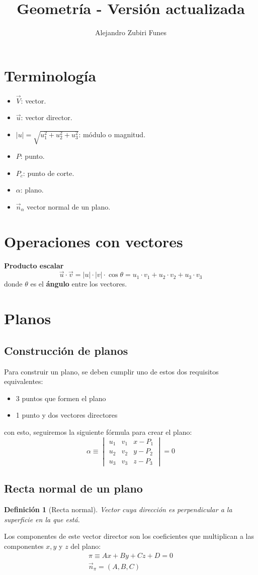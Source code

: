\documentclass{article}
\title{Geometría - Versión actualizada}
\author{Alejandro Zubiri Funes}
\date{}
\newtheorem*{normal*}{Definición}
\begin{document}
\maketitle
\section*{Terminología}
\begin{itemize}
    \item $\vec{V}$: vector.
    \item $\vec{u}$: vector director.
    \item $|u|=\sqrt{u_1^2+u_2^2+u_3^2}$: módulo o magnitud.
    \item $P$: punto.
    \item $P_c$: punto de corte.
    \item $\alpha$: plano.
    \item $\vec{n}_\alpha$ vector normal de un plano. 
\end{itemize}

\section*{Operaciones con vectores}
\textbf{Producto escalar}\\
\[
    \vec{u}\cdot \vec{v}=|u|\cdot |v|\cdot \cos \theta = u_1\cdot v_1+u_2\cdot v_2+u_3\cdot v_3
\]
donde $\theta$ es el \textbf{ángulo} entre los vectores.

\section*{Planos}
\subsection*{Construcción de planos}
Para construir un plano, se deben cumplir uno de estos dos requisitos equivalentes:
\begin{itemize}
    \item 3 puntos que formen el plano
    \item 1 punto y dos vectores directores
\end{itemize}
con esto, seguiremos la siguiente fórmula para crear el plano:
\[
    \alpha \equiv \begin{vmatrix}
    u_1 & v_1 & x-P_1 \\ 
    u_2 & v_2 & y-P_2 \\ 
    u_3 & v_3 & z-P_3
    \end{vmatrix}=0
\]
\subsection*{Recta normal de un plano}
\begin{normal*}[Recta normal]
    Vector cuya dirección es perpendicular a la superficie en la que está.
\end{normal*}
Los componentes de este vector director son los coeficientes que multiplican a las
componentes $x,y$ y $z$ del plano:
\begin{align}
    \pi\equiv Ax+By+Cz+D=0\\
    \vec{n}_\pi=(A,B,C)
\end{align}
\end{document}

